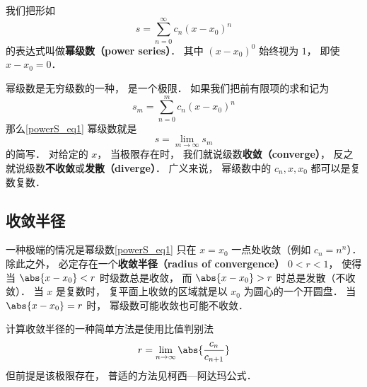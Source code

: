 
\begin{issues}
\issueDraft
\end{issues}


我们把形如
\begin{equation}\label{powerS_eq1}
s = \sum_{n=0}^\infty c_n (x-x_0)^n
\end{equation}
的表达式叫做\textbf{幂级数（power series）}． 其中 $(x-x_0)^0$ 始终视为 $1$， 即使 $x-x_0 = 0$．

幂级数是无穷级数的一种， 是一个极限． 如果我们把前有限项的求和记为
\begin{equation}
s_m = \sum_{n=0}^m c_n (x-x_0)^n
\end{equation}
那么\autoref{powerS_eq1} 幂级数就是
\begin{equation}
s = \lim_{m\to\infty} s_m
\end{equation}
的简写． 对给定的 $x$， 当极限存在时， 我们就说级数\textbf{收敛（converge）}， 反之就说级数\textbf{不收敛}或\textbf{发散（diverge）}． 广义来说， 幂级数中的 $c_n, x, x_0$ 都可以是复数复数．

\subsection{收敛半径}
一种极端的情况是幂级数\autoref{powerS_eq1} 只在 $x = x_0$ 一点处收敛（例如 $c_n = n^n$）． 除此之外， 必定存在一个\textbf{收敛半径（radius of convergence）} $0 < r < 1$， 使得当 $\abs{x-x_0} < r$ 时级数总是收敛， 而 $\abs{x-x_0} > r$ 时总是发散（不收敛）． 当 $x$ 是复数时， 复平面上收敛的区域就是以 $x_0$ 为圆心的一个开圆盘． 当 $\abs{x - x_0} = r$ 时， 幂级数可能收敛也可能不收敛．

计算收敛半径的一种简单方法是使用比值判别法
\begin{equation}
r = \lim_{n \to \infty} \abs{\frac{c_n}{c_{n+1}}}
\end{equation}
但前提是该极限存在， 普适的方法见柯西—阿达玛公式．
